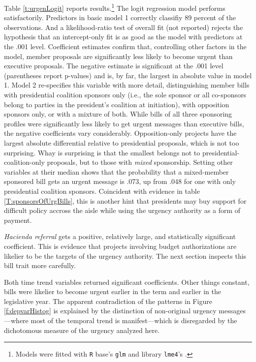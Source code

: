\documentclass[letter,12pt]{article}
\begin{document}
Table \ref{t:urgenLogit} reports results.\footnote{Models were fitted with \texttt{R} base's \texttt{glm} and library \texttt{lme4}'s \citep{lme4.2015}.} The logit regression model performs satisfactorily. Predictors in basic model 1 correctly classifiy 89 percent of the observations. And a likelihood-ratio test of overall fit (not reported) rejects the hypothesis that an intercept-only fit is as good as the model with predictors at the .001 level. Coefficient estimates confirm that, controlling other factors in the model, member proposals are significantly less likely to become urgent than executive proposals. The negative estimate is significant at the .001 level (parentheses report p-values) and is, by far, the largest in absolute value in model 1. Model 2 re-specifies this variable with more detail, distinguishing member bills with presidential coalition sponsors only (i.e., the sole sponsor or all co-sponsors belong to parties in the president's coalition at initiation), with opposition sponsors only, or with a mixture of both. While bills of all three sponsoring profiles were significantly less likely to get urgent messages than executive bills, the negative coefficients vary considerably. Opposition-only projects have the largest absolute differential relative to presidential proposals, which is not too surprising. Whay is surprising is that the smallest belongs not to presidential-coalition-only proposals, but to those with \emph{mixed} sponsorship. Setting other variables at their median shows that the probability that a mixed-member sponsored bill gets an urgent message is .073, up from .048 for one with only presidential coalition sponsors. Coincident with evidence in table \ref{T:sponsorsOfUrgBills}, this is another hint that presidents may buy support for difficult policy accross the aisle while using the urgency authority as a form of payment. 

\emph{Hacienda referral} gets a positive, relatively large, and statistically significant coefficient. This is evidence that projects involving budget authorizations are likelier to be the targets of the urgency authority. The next section inspects this bill trait more carefully.

Both time trend variables returned significant coefficients. Other things constant, bills were likelier to become urgent earlier in the term and earlier in the legislative year. The apparent contradiction of the patterns in Figure \ref{f:depvarHistog} is explained by the distinction of non-original urgency messages---where most of the temporal trend is manifest---which is disregarded by the dichotomous measure of the urgency analyzed here. 
\end{document}
